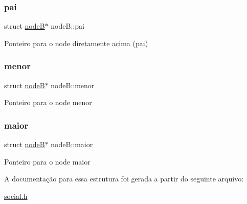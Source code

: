 \subsubsection{\texorpdfstring{pai}{pai}}
{\footnotesize\ttfamily struct \mbox{\hyperlink{structnodeB}{nodeB}}$\ast$ node\+B\+::pai}

Ponteiro para o node diretamente acima (pai) \mbox{\label{structnodeB_a433b5c01c13cba63ca218f887ce3fef7}} 
\subsubsection{\texorpdfstring{menor}{menor}}
{\footnotesize\ttfamily struct \mbox{\hyperlink{structnodeB}{nodeB}}$\ast$ node\+B\+::menor}

Ponteiro para o node menor \mbox{\label{structnodeB_a8c430943b45eba8b8ddb4007b0ed4d2c}} 
\subsubsection{\texorpdfstring{maior}{maior}}
{\footnotesize\ttfamily struct \mbox{\hyperlink{structnodeB}{nodeB}}$\ast$ node\+B\+::maior}

Ponteiro para o node maior 

A documentação para essa estrutura foi gerada a partir do seguinte arquivo\+:\begin{DoxyCompactItemize}
\item 
\mbox{\hyperlink{social_8h}{social.\+h}}\end{DoxyCompactItemize}
